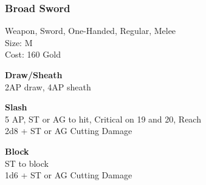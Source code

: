 \subsubsection{Broad Sword}\label{weapon:broadSword}
Weapon, Sword, One-Handed, Regular, Melee\\
Size: M\\
Cost: 160 Gold

\textbf{Draw/Sheath}\\
2AP draw, 4AP sheath

\textbf{Slash}\\
5 AP, ST or AG to hit, Critical on 19 and 20,  Reach\\
2d8 + \texttimes ST or AG Cutting Damage

\textbf{Block}\\
ST to block\\
1d6 + \texttimes ST or AG Cutting Damage

